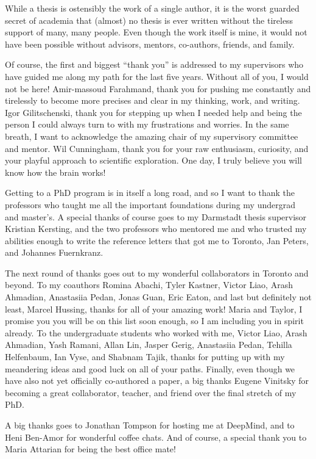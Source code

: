 While a thesis is ostensibly the work of a single author, it is the worst guarded secret of academia that (almost) no thesis is ever written without the tireless support of many, many people.
Even though the work itself is mine, it would not have been possible without advisors, mentors, co-authors, friends, and family.

Of course, the first and biggest ``thank you'' is addressed to my supervisors who have guided me along my path for the last five years.
Without all of you, I would not be here!
Amir-massoud Farahmand, thank you for pushing me constantly and tirelessly to become more precises and clear in my thinking, work, and writing.
Igor Gilitschenski, thank you for stepping up when I needed help and being the person I could always turn to with my frustrations and worries.
In the same breath, I want to acknowledge the amazing chair of my supervisory committee and mentor.
Wil Cunningham, thank you for your raw enthusiasm, curiosity, and your playful approach to scientific exploration.
One day, I truly believe you will know how the brain works!

Getting to a PhD program is in itself a long road, and so I want to thank the professors who taught me all the important foundations during my undergrad and master's.
A special thanks of course goes to my Darmstadt thesis supervisor Kristian Kersting, and the two professors who mentored me and who trusted my abilities enough to write the reference letters that got me to Toronto, Jan Peters, and Johannes Fuernkranz.

The next round of thanks goes out to my wonderful collaborators in Toronto and beyond.
To my coauthors Romina Abachi, Tyler Kastner, Victor Liao, Arash Ahmadian, Anastasiia Pedan, Jonas Guan, Eric Eaton, and last but definitely not least, Marcel Hussing, thanks for all of your amazing work!
Maria and Taylor, I promise you you will be on this list soon enough, so I am including you in spirit already.
To the undergraduate students who worked with me, Victor Liao, Arash Ahmadian, Yash Ramani, Allan Lin, Jasper Gerig, Anastasiia Pedan, Tehilla Helfenbaum, Ian Vyse, and Shabnam Tajik, thanks for putting up with my meandering ideas and good luck on all of your paths.
Finally, even though we have also not yet officially co-authored a paper, a big thanks Eugene Vinitsky for becoming a great collaborator, teacher, and friend over the final stretch of my PhD.

A big thanks goes to Jonathan Tompson for hosting me at DeepMind, and to Heni Ben-Amor for wonderful coffee chats.
And of course, a special thank you to Maria Attarian for being the best office mate!

